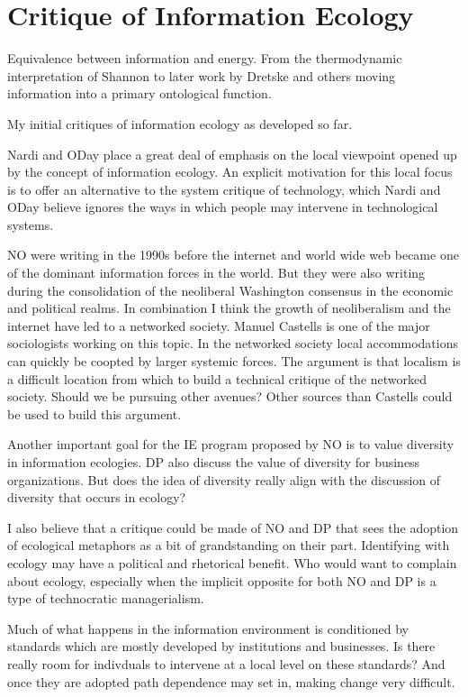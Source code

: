 \section{Critique of Information Ecology}

Equivalence between information and energy. From the thermodynamic interpretation of Shannon to later work by Dretske and others moving information into a primary ontological function.


My initial critiques of information ecology as developed so far.

Nardi and ODay place a great deal of emphasis on the local viewpoint opened up by the concept of information ecology. An explicit motivation for this local focus is to offer an alternative to the system critique of technology, which Nardi and ODay believe ignores the ways in which people may intervene in technological systems.

NO were writing in the 1990s before the internet and world wide web became one of the dominant information forces in the world. But they were also writing during the consolidation of the neoliberal Washington consensus in the economic and political realms. In combination I think the growth of neoliberalism and the internet have led to a networked society. Manuel Castells is one of the major sociologists working on this topic. In the networked society local accommodations can quickly be coopted by larger systemic forces. The argument is that localism is a difficult location from which to build a technical critique of the networked society. Should we be pursuing other avenues? Other sources than Castells could be used to build this argument.

Another important goal for the IE program proposed by NO is to value diversity in information ecologies. DP also discuss the value of diversity for business organizations. But does the idea of diversity really align with the discussion of diversity that occurs in ecology?

I also believe that a critique could be made of NO and DP that sees the adoption of ecological metaphors as a bit of grandstanding on their part. Identifying with ecology may have a political and rhetorical benefit. Who would want to complain about ecology, especially when the implicit opposite for both NO and DP is a type of technocratic managerialism.

Much of what happens in the information environment is conditioned by standards which are mostly developed by institutions and businesses. Is there really room for indivduals to intervene at a local level on these standards? And once they are adopted path dependence may set in, making change very difficult.